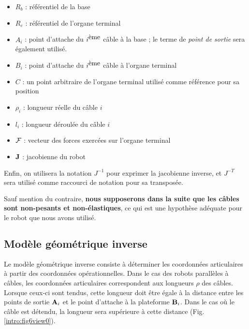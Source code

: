 \begin{itemize}
 \item $R_b$ : référentiel de la base
 \item $R_e$ : référentiel de l'organe terminal
 \item $A_i$ : point d'attache du $i^{\hbox{ème}}$ câble à la base ; le terme de {\it point de sortie} sera également utilisé.
 \item $B_i$ : point d'attache du $i^{\hbox{ème}}$ câble à l'organe terminal
 \item $C$ : un point arbitraire de l'organe terminal utilisé comme référence pour sa position
 \item $\rho_i$ : longueur réelle du câble $i$
 \item $l_i$ : longueur déroulée du câble $i$
 \item $\bf {\mathcal F}$ : vecteur des forces exercées sur l'organe terminal
 \item $\bf J$ : jacobienne du robot
\end{itemize}
Enfin, on utilisera la notation $J^{-1}$ pour exprimer la jacobienne inverse, et $J^{-T}$ sera utilisé comme raccourci de notation pour sa transposée.

Sauf mention du contraire, {\bf nous supposerons dans la suite que les câbles sont non-pesants et non-élastiques}, ce qui est une hypothèse adéquate pour le robot que nous avons utilisé.

\subsection{Modèle géométrique inverse}

Le modèle géométrique inverse consiste à déterminer les coordonnées articulaires à partir des coordonnées opérationnelles. Dans le cas des robots parallèles à câbles, les coordonnées articulaires correspondent aux longueurs $\rho$ des câbles. Lorsque ceux-ci sont tendus, cette longueur doit être égale à la distance entre les points de sortie ${\bf A}_i$ et le point d'attache à la plateforme ${\bf B}_i$. Dans le cas où le câble est détendu, la longueur sera supérieure à cette distance (Fig.\ref{intro:fig6view0}).\\

